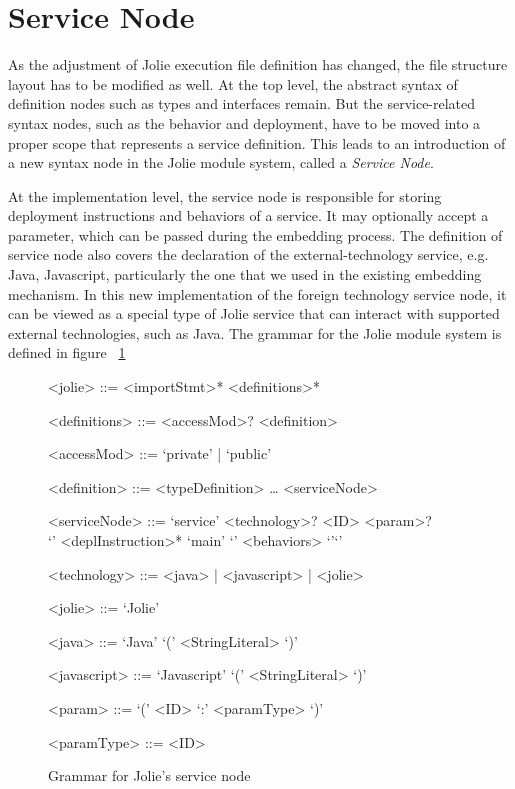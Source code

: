 \section{Service Node}

As the adjustment of Jolie execution file definition has changed, the file structure layout has to be modified as well.  At the top level, the abstract syntax of definition nodes such as types and interfaces remain. But the service-related syntax nodes, such as the behavior and deployment, have to be moved into a proper scope that represents a service definition. This leads to an introduction of a new syntax node in the Jolie module system, called a \textit{Service Node}.

At the implementation level, the service node is responsible for storing deployment instructions and behaviors of a service. It may optionally accept a parameter, which can be passed during the embedding process.
The definition of service node also covers the declaration of the external-technology service, e.g. Java, Javascript, particularly the one that we used in the existing embedding mechanism.
In this new implementation of the foreign technology service node, it can be viewed as a special type of Jolie service that can interact with supported external technologies, such as Java.
The grammar for the Jolie module system is defined in figure ~\ref{fig:jolie-servicenode-grammar}

\begin{figure}[ht]
    \begin{framed}
        \begin{grammar}
            <jolie> ::= <importStmt>* <definitions>*

            <definitions> ::= <accessMod>? <definition>

            <accessMod> ::= `private' | `public'

            <definition> ::=  <typeDefinition>
            \dots
            \alt <serviceNode>

            <serviceNode> ::= `service' <technology>? <ID> <param>? \\ `{' <deplInstruction>* `main' `{' <behaviors> `}'`}'

            <technology> ::= <java> | <javascript> | <jolie>

            <jolie> ::= `Jolie'

            <java> ::= `Java' `(' <StringLiteral> `)'

            <javascript> ::= `Javascript' `(' <StringLiteral> `)'

            <param> ::= `(' <ID> `:' <paramType> `)'

            <paramType> ::= <ID>
        \end{grammar}
    \end{framed}
    \caption{Grammar for Jolie's service node}
    \label{fig:jolie-servicenode-grammar}
\end{figure}

